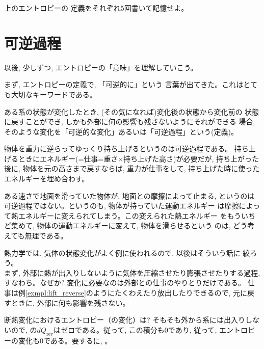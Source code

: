 \begin{q}\label{q:def_enthalpy} 上のエントロピーの
定義をそれぞれ5回書いて記憶せよ。\end{q}\mv


\section{可逆過程}

以後, 少しずつ, エントロピーの「意味」を理解していこう。

まず, エントロピーの定義で, 「可逆的に」という
言葉が出てきた。これはとても大切なキーワードである。

ある系の状態が変化したとき, (その気になれば)変化後の状態から変化前の
状態に戻すことができ, しかも外部に何の影響も残さないようにそれができる
場合, そのような変化を「可逆的な変化」あるいは「可逆過程」という(定義)。

\begin{exmpl}\label{exmpl:lift_reverse} 物体を重力に逆らってゆっくり持ち上げるというのは可逆過程である。
持ち上げるときにエネルギー(=仕事=重さ×持ち上げた高さ)が必要だが, 
持ち上がった後に, 物体を元の高さまで戻すならば, 重力が仕事をして, 
持ち上げた時に使ったエネルギーを埋め合わす。\end{exmpl}

\begin{exmpl} ある速さで地面を滑っていた物体が, 地面との摩擦によって止まる, 
というのは可逆過程ではない。というのも, 物体が持っていた運動エネルギー
は摩擦によって熱エネルギーに変えられてしまう。この変えられた熱エネルギー
をもういちど集めて, 物体の運動エネルギーに変えて, 物体を滑らせるという
のは, どう考えても無理である。\end{exmpl}

熱力学では, 気体の状態変化がよく例に使われるので, 以後はそういう話に
絞ろう。\\

まず, 外部に熱が出入りしないように気体を圧縮させたり膨張させたりする過程, 
すなわち。なぜか? 
変化に必要なのは外部との仕事のやりとりだけである。
仕事は例\ref{exmpl:lift_reverse}のようにたくわえたり放出したりできるので, 
元に戻すときに, 外部に何も影響を残さない。

断熱変化におけるエントロピー（の変化）は? そもそも外から系には出入りしないので, 
の$dQ_{\text{rev}}$はゼロである。従って, この積分も0であり, 
従って, エントロピーの変化も0である。要するに, 。\\

